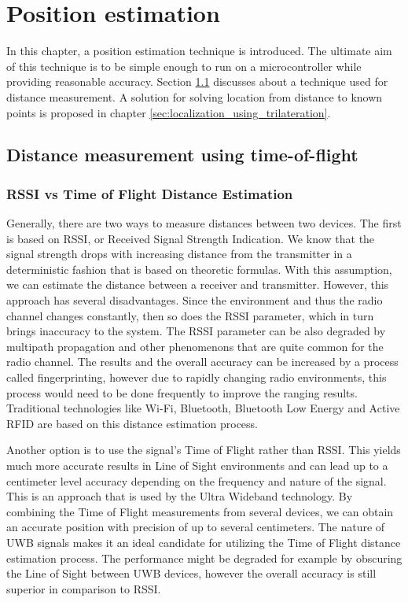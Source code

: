 \documentclass[\main/main.tex]{subfiles}
\begin{document}
\graphicspath{{img/}{position_estimation/img/}}
\chapter{Position estimation}

In this chapter, a position estimation technique is introduced. The ultimate aim of this technique is to be simple enough to run on a microcontroller while providing reasonable accuracy. Section \ref{sec:distance_measurement_using_time_of_flight} discusses about a technique used for distance measurement. A solution for solving location from distance to known points is proposed in chapter \ref{sec:localization_using_trilateration}.

\section{Distance measurement using time-of-flight}
\label{sec:distance_measurement_using_time_of_flight}

\subsection{RSSI vs Time of Flight Distance Estimation}
Generally, there are two ways to measure distances between two devices. The first is based on RSSI, or Received Signal Strength Indication. We know that the signal strength drops with increasing distance from the transmitter in a deterministic fashion that is based on theoretic formulas. With this assumption, we can estimate the distance between a receiver and transmitter. However, this approach has several disadvantages. Since the environment and thus the radio channel changes constantly, then so does the RSSI parameter, which in turn brings inaccuracy to the system. The RSSI parameter can be also degraded by multipath propagation and other phenomenons that are quite common for the radio channel. The results and the overall accuracy can be increased by a process called fingerprinting, however due to rapidly changing radio environments, this process would need to be done frequently to improve the ranging results. Traditional technologies like Wi-Fi, Bluetooth, Bluetooth Low Energy and Active RFID are based on this distance estimation process.

Another option is to use the signal’s Time of Flight rather than RSSI. This yields much more accurate results in Line of Sight environments and can lead up to a centimeter level accuracy depending on the frequency and nature of the signal. This is an approach that is used by the Ultra Wideband technology. By combining the Time of Flight measurements from several devices, we can obtain an accurate position with precision of up to several centimeters. The nature of UWB signals makes it an ideal candidate for utilizing the Time of Flight distance estimation process. The performance might be degraded for example by obscuring the Line of Sight between UWB devices, however the overall accuracy is still superior in comparison to RSSI.
\end{document}
